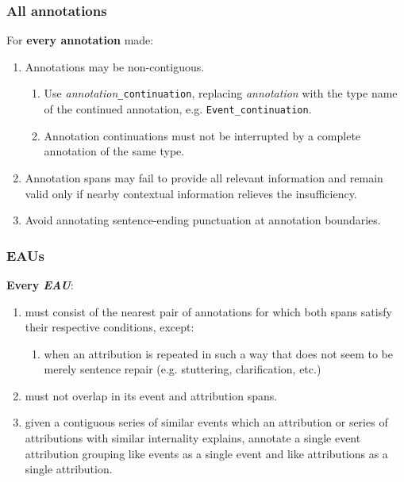 \documentclass[a4paper,12pt]{article}
\begin{document}
    \subsubsection{All annotations}
    For \textbf{every annotation} made:
        \begin{enumerate}
            \item Annotations may be non-contiguous.
                \begin{enumerate}
                    \item Use \emph{annotation}\texttt{\_continuation}, replacing \emph{annotation} with the type name of the continued annotation, e.g. \texttt{Event\_continuation}.
                    \item Annotation continuations must not be interrupted by a complete annotation of the same type.
                \end{enumerate}
            \item Annotation spans may fail to provide all relevant information and remain valid only if nearby contextual information relieves the insufficiency.
            \item Avoid annotating sentence-ending punctuation at annotation boundaries.
        \end{enumerate}


    \subsubsection{EAUs}
    \textbf{Every \emph{EAU}}:
        \begin{enumerate}
            \item must consist of the nearest pair of annotations for which both spans satisfy their respective conditions, except:
                \begin{enumerate}
                    \item when an attribution is repeated in such a way that does not seem to be merely sentence repair (e.g. stuttering, clarification, etc.)
                \end{enumerate}
            \item must not overlap in its event and attribution spans.
            \item given a contiguous series of similar events which an attribution or series of attributions with similar internality explains, annotate a single event attribution grouping like events as a single event and like attributions as a single attribution.
        \end{enumerate}
\end{document}
